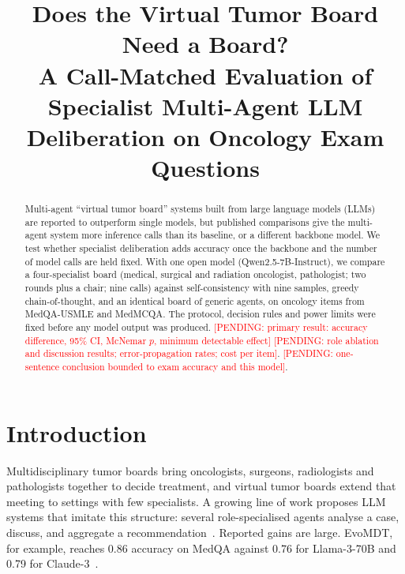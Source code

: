 \IfFileExists{IEEEtran.cls}{\documentclass[conference]{IEEEtran}}{\documentclass[10pt,twocolumn]{article}\usepackage[margin=0.75in]{geometry}}
\title{Does the Virtual Tumor Board Need a Board?\\ A Call-Matched Evaluation of Specialist Multi-Agent LLM Deliberation on Oncology Exam Questions}
\author{\IEEEauthorblockN{Vibhum Sharma}\IEEEauthorblockA{Department of Information Technology, Indian Institute of Information Technology Allahabad, India}}
\newcommand{\pending}[1]{\textcolor{red}{[PENDING: #1]}}
\begin{document}
\maketitle

\begin{abstract}
Multi-agent ``virtual tumor board'' systems built from large language models (LLMs) are reported to outperform single models, but published comparisons give the multi-agent system more inference calls than its baseline, or a different backbone model. We test whether specialist deliberation adds accuracy once the backbone and the number of model calls are held fixed. With one open model (Qwen2.5-7B-Instruct), we compare a four-specialist board (medical, surgical and radiation oncologist, pathologist; two rounds plus a chair; nine calls) against self-consistency with nine samples, greedy chain-of-thought, and an identical board of generic agents, on oncology items from MedQA-USMLE and MedMCQA. The protocol, decision rules and power limits were fixed before any model output was produced. \pending{primary result: accuracy difference, 95\% CI, McNemar $p$, minimum detectable effect} \pending{role ablation and discussion results; error-propagation rates; cost per item}. \pending{one-sentence conclusion bounded to exam accuracy and this model}.
\end{abstract}

\section{Introduction}
Multidisciplinary tumor boards bring oncologists, surgeons, radiologists and pathologists together to decide treatment, and virtual tumor boards extend that meeting to settings with few specialists. A growing line of work proposes LLM systems that imitate this structure: several role-specialised agents analyse a case, discuss, and aggregate a recommendation~\cite{liu2025evomdt,han2025consensus,kim2025mlhc}. Reported gains are large. EvoMDT, for example, reaches 0.86 accuracy on MedQA against 0.76 for Llama-3-70B and 0.79 for Claude-3~\cite{liu2025evomdt}.
\end{document}

